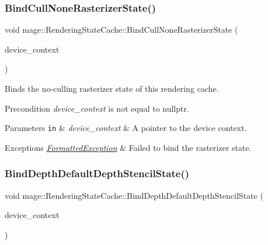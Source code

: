 \subsubsection{\texorpdfstring{Bind\+Cull\+None\+Rasterizer\+State()}{BindCullNoneRasterizerState()}}
{\footnotesize\ttfamily void mage\+::\+Rendering\+State\+Cache\+::\+Bind\+Cull\+None\+Rasterizer\+State (\begin{DoxyParamCaption}\item[{I\+D3\+D11\+Device\+Context2 $\ast$}]{device\+\_\+context }\end{DoxyParamCaption})}

Binds the no-\/culling rasterizer state of this rendering cache.

\begin{DoxyPrecond}{Precondition}
{\itshape device\+\_\+context} is not equal to {\ttfamily nullptr}. 
\end{DoxyPrecond}

\begin{DoxyParams}[1]{Parameters}
\mbox{\tt in}  & {\em device\+\_\+context} & A pointer to the device context. \\
\hline
\end{DoxyParams}

\begin{DoxyExceptions}{Exceptions}
{\em \hyperlink{structmage_1_1_formatted_exception}{Formatted\+Exception}} & Failed to bind the rasterizer state. \\
\hline
\end{DoxyExceptions}
\hypertarget{structmage_1_1_rendering_state_cache_ab280d0bf64ab85dbb66b3d1632fa40b1}{}\label{structmage_1_1_rendering_state_cache_ab280d0bf64ab85dbb66b3d1632fa40b1} 
\subsubsection{\texorpdfstring{Bind\+Depth\+Default\+Depth\+Stencil\+State()}{BindDepthDefaultDepthStencilState()}}
{\footnotesize\ttfamily void mage\+::\+Rendering\+State\+Cache\+::\+Bind\+Depth\+Default\+Depth\+Stencil\+State (\begin{DoxyParamCaption}\item[{I\+D3\+D11\+Device\+Context2 $\ast$}]{device\+\_\+context }\end{DoxyParamCaption})}

